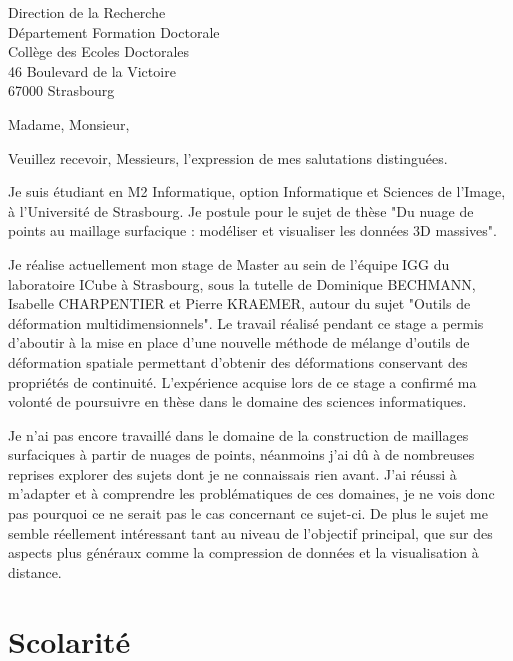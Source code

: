 \documentclass[11pt,a4paper,sans]{moderncv}
\begin{document}
{Direction de la Recherche\\
Département Formation Doctorale\\
Collège des Ecoles Doctorales\\
46 Boulevard de la Victoire\\
67000 Strasbourg}
\date{\mydateformat\today}
\opening{Madame, Monsieur,}
\closing{Veuillez recevoir, Messieurs, l'expression de mes salutations
distinguées.}
\makelettertitle

Je suis étudiant en M2 Informatique, option Informatique et Sciences de
l'Image, à l'Université de Strasbourg. Je postule pour le sujet de thèse "Du
nuage de points au maillage surfacique : modéliser et visualiser les données
3D massives".

Je réalise actuellement mon stage de Master au sein de l'équipe IGG du
laboratoire ICube à Strasbourg, sous la tutelle de Dominique BECHMANN,
Isabelle CHARPENTIER et Pierre KRAEMER, autour du sujet "Outils de déformation
multidimensionnels". Le travail réalisé pendant ce stage a permis d'aboutir à
la mise en place d'une nouvelle méthode de mélange d'outils de déformation
spatiale permettant d'obtenir des déformations conservant des propriétés de
continuité. L'expérience acquise lors de ce stage a confirmé ma volonté de
poursuivre en thèse dans le domaine des sciences informatiques.

Je n'ai pas encore travaillé dans le domaine de la construction de maillages
surfaciques à partir de nuages de points, néanmoins j'ai dû à de nombreuses
reprises explorer des sujets dont je ne connaissais rien avant. J'ai réussi à
m'adapter et à comprendre les problématiques de ces domaines, je ne vois donc
pas pourquoi ce ne serait pas le cas concernant ce sujet-ci. De plus le sujet
me semble réellement intéressant tant au niveau de l'objectif principal, que
sur des aspects plus généraux comme la compression de données et la
visualisation à distance.

\makeletterclosing

\clearpage

\makecvtitle

\section{Scolarité}
\end{document}
